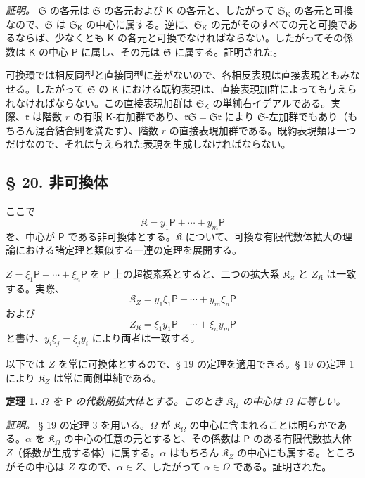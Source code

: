 \emph{証明。} $\mathfrak S$ の各元は $\mathfrak S$ の各元および $\mathsf K$ の各元と、したがって $\mathfrak S_{\mathsf K}$ の各元と可換なので、$\mathfrak S$ は $\mathfrak S_{\mathsf K}$ の中心に属する。逆に、$\mathfrak S_{\mathsf K}$ の元がそのすべての元と可換であるならば、少なくとも $\mathsf K$ の各元と可換でなければならない。したがってその係数は $\mathsf K$ の中心 $\mathsf P$ に属し、その元は $\mathfrak S$ に属する。証明された。

可換環では相反同型と直接同型に差がないので、各相反表現は直接表現ともみなせる。したがって $\mathfrak S$ の $\mathsf K$ における既約表現は、直接表現加群によっても与えられなければならない。この直接表現加群は $\mathfrak S_{\mathsf K}$ の単純右イデアルである。実際、$\mathfrak r$ は階数 $r$ の有限 $\mathsf K$-右加群であり、$\mathfrak r\mathfrak S=\mathfrak S\mathfrak r$ により $\mathfrak S$-左加群でもあり（もちろん混合結合則を満たす）、階数 $r$ の直接表現加群である。既約表現類は一つだけなので、それは与えられた表現を生成しなければならない。

\subsection*{§ 20. 非可換体}\label{nichtkommutative-koerper}

ここで
\[
\mathfrak K=y_1\mathsf P+\cdots+y_m\mathsf P
\]
を、中心が $\mathsf P$ である非可換体とする。$\mathfrak K$ について、可換な有限代数体拡大の理論における諸定理と類似する一連の定理を展開する。

$Z=\xi_1\mathsf P+\cdots+\xi_n\mathsf P$ を $\mathsf P$ 上の超複素系とすると、二つの拡大系 $\mathfrak K_Z$ と $Z_{\mathfrak K}$ は一致する。実際、
\[
\mathfrak K_Z=y_1\xi_1\mathsf P+\cdots+y_m\xi_n\mathsf P
\]
および
\[
Z_{\mathfrak K}=\xi_1y_1\mathsf P+\cdots+\xi_ny_m\mathsf P
\]
と書け、$y_i\xi_j=\xi_jy_i$ により両者は一致する。

以下では $Z$ を常に可換体とするので、§ 19 の定理を適用できる。§ 19 の定理 1 により $\mathfrak K_Z$ は常に両側単純である。

\textbf{定理 1.} \emph{$\Omega$ を $\mathsf P$ の代数閉拡大体とする。このとき $\mathfrak K_\Omega$ の中心は $\Omega$ に等しい。}

\emph{証明。} § 19 の定理 3 を用いる。$\Omega$ が $\mathfrak K_\Omega$ の中心に含まれることは明らかである。$\alpha$ を $\mathfrak K_\Omega$ の中心の任意の元とすると、その係数は $\mathsf P$ のある有限代数拡大体 $Z$（係数が生成する体）に属する。$\alpha$ はもちろん $\mathfrak K_Z$ の中心にも属する。ところがその中心は $Z$ なので、$\alpha\in Z$、したがって $\alpha\in\Omega$ である。証明された。

